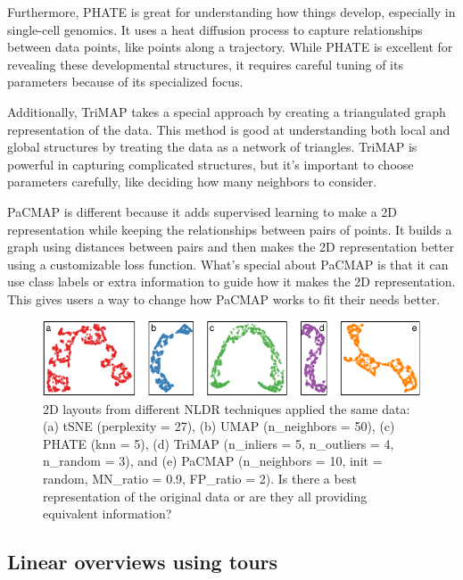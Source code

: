 \documentclass[
  12pt]{article}
\begin{document}
Furthermore, PHATE \citep{article03} is great for understanding how
things develop, especially in single-cell genomics. It uses a heat
diffusion process to capture relationships between data points, like
points along a trajectory. While PHATE is excellent for revealing these
developmental structures, it requires careful tuning of its parameters
because of its specialized focus.

Additionally, TriMAP \citep{article02} takes a special approach by
creating a triangulated graph representation of the data. This method is
good at understanding both local and global structures by treating the
data as a network of triangles. TriMAP is powerful in capturing
complicated structures, but it's important to choose parameters
carefully, like deciding how many neighbors to consider.

PaCMAP \citep{article01} is different because it adds supervised
learning to make a 2D representation while keeping the relationships
between pairs of points. It builds a graph using distances between pairs
and then makes the 2D representation better using a customizable loss
function. What's special about PaCMAP is that it can use class labels or
extra information to guide how it makes the 2D representation. This
gives users a way to change how PaCMAP works to fit their needs better.

\begin{figure}

{\centering \includegraphics[width=1\textwidth,height=\textheight]{paper_files/figure-pdf/fig-nldervis-1.pdf}

}

\caption{\label{fig-nldervis}2D layouts from different NLDR techniques
applied the same data: (a) tSNE (perplexity = 27), (b) UMAP
(n\_neighbors = 50), (c) PHATE (knn = 5), (d) TriMAP (n\_inliers = 5,
n\_outliers = 4, n\_random = 3), and (e) PaCMAP (n\_neighbors = 10, init
= random, MN\_ratio = 0.9, FP\_ratio = 2). Is there a best
representation of the original data or are they all providing equivalent
information?}

\end{figure}

\hypertarget{linear-overviews-using-tours}{%
\subsection{Linear overviews using
tours}\label{linear-overviews-using-tours}}
\end{document}
